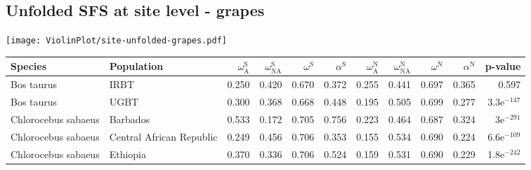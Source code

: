 \subsection{Unfolded SFS at site level - grapes} 
\begin{center}
\texttt{[image: ViolinPlot/site-unfolded-grapes.pdf]} 
\begin{adjustbox}{width = 1\textwidth}
\begin{tabular}{llrrrrrrrrr}
\toprule
             Species &                Population & $\omega_{\textrm{A}}^{\textrm{S}}$ & $\omega_{\textrm{NA}}^{\textrm{S}}$ & $\omega^{\textrm{S}}$ & $\alpha^{\textrm{S}}$ & $\omega_{\textrm{A}}^{\textrm{N}}$ & $\omega_{\textrm{NA}}^{\textrm{N}}$ & $\omega^{\textrm{N}}$ & $\alpha^{\textrm{N}}$ &       p-value \\
\midrule
          Bos taurus &                      IRBT &                              0.250 &                               0.420 &                 0.670 &                 0.372 &                              0.255 &                               0.441 &                 0.697 &                 0.365 &         0.597 \\
          Bos taurus &                      UGBT &                              0.300 &                               0.368 &                 0.668 &                 0.448 &                              0.195 &                               0.505 &                 0.699 &                 0.277 & 3.3e$^{-147}$ \\
 Chlorocebus sabaeus &                  Barbados &                              0.533 &                               0.172 &                 0.705 &                 0.756 &                              0.223 &                               0.464 &                 0.687 &                 0.324 &   3e$^{-291}$ \\
 Chlorocebus sabaeus &  Central African Republic &                              0.249 &                               0.456 &                 0.706 &                 0.353 &                              0.155 &                               0.534 &                 0.690 &                 0.224 & 6.6e$^{-109}$ \\
 Chlorocebus sabaeus &                  Ethiopia &                              0.370 &                               0.336 &                 0.706 &                 0.524 &                              0.159 &                               0.531 &                 0.690 &                 0.229 & 1.8e$^{-242}$ \\

\end{tabular}
\end{adjustbox}
\end{center}
